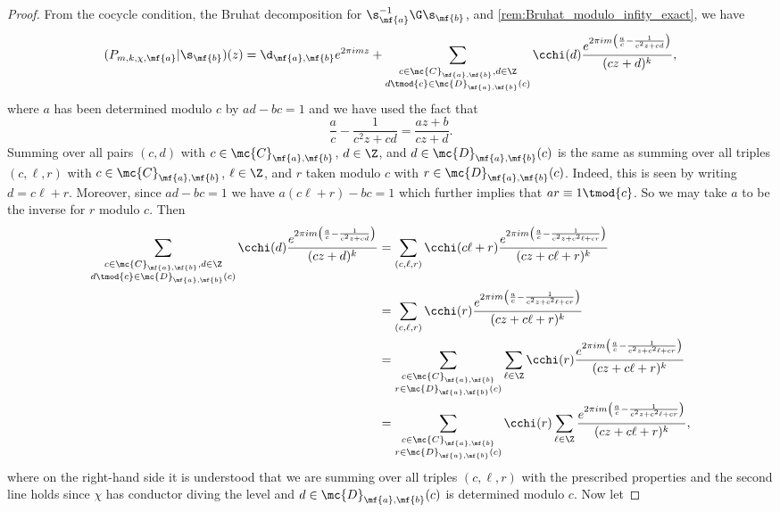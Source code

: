     \begin{proof}
      From the cocycle condition, the Bruhat decomposition for $\s_{\mf{a}}^{-1}\G\s_{\mf{b}}$, and \cref{rem:Bruhat_modulo_infity_exact}, we have
      \[
        (P_{m,k,\chi,\mf{a}}|\s_{\mf{b}})(z) = \d_{\mf{a},\mf{b}}e^{2\pi imz}+\sum_{\substack{c \in \mc{C}_{\mf{a},\mf{b}}, d \in \Z \\ d \tmod{c} \in \mc{D}_{\mf{a},\mf{b}}(c)}}\cchi(d)\frac{e^{2\pi im\left(\frac{a}{c}-\frac{1}{c^{2}z+cd}\right)}}{(cz+d)^{k}},
      \]
      where $a$ has been determined modulo $c$ by $ad-bc = 1$ and we have used the fact that
      \[
        \frac{a}{c}-\frac{1}{c^{2}z+cd} = \frac{az+b}{cz+d}.
      \]
      Summing over all pairs $(c,d)$ with $c \in \mc{C}_{\mf{a},\mf{b}}$, $d \in \Z$, and $d \in \mc{D}_{\mf{a},\mf{b}}(c)$ is the same as summing over all triples $(c,\ell,r)$ with $c \in \mc{C}_{\mf{a},\mf{b}}$, $\ell \in \Z$, and $r$ taken modulo $c$ with $r \in \mc{D}_{\mf{a},\mf{b}}(c)$. Indeed, this is seen by writing $d = c\ell+r$. Moreover, since $ad-bc = 1$ we have $a(c\ell+r)-bc = 1$ which further implies that $ar \equiv 1 \tmod{c}$. So we may take $a$ to be the inverse for $r$ modulo $c$. Then
      \begin{align*}
        \sum_{\substack{c \in \mc{C}_{\mf{a},\mf{b}}, d \in \Z \\ d \tmod{c} \in \mc{D}_{\mf{a},\mf{b}}(c)}}\cchi(d)\frac{e^{2\pi im\left(\frac{a}{c}-\frac{1}{c^{2}z+cd}\right)}}{(cz+d)^{k}} &= \sum_{(c,\ell,r)}\cchi(c\ell+r)\frac{e^{2\pi im\left(\frac{a}{c}-\frac{1}{c^{2}z+c^{2}\ell+cr}\right)}}{(cz+c\ell+r)^{k}} \\
        &= \sum_{(c,\ell,r)}\cchi(r)\frac{e^{2\pi im\left(\frac{a}{c}-\frac{1}{c^{2}z+c^{2}\ell+cr}\right)}}{(cz+c\ell+r)^{k}} \\
        &= \sum_{\substack{c \in \mc{C}_{\mf{a},\mf{b}} \\ r \in \mc{D}_{\mf{a},\mf{b}}(c)}}\sum_{\ell \in \Z}\cchi(r)\frac{e^{2\pi im\left(\frac{a}{c}-\frac{1}{c^{2}z+c^{2}\ell+cr}\right)}}{(cz+c\ell+r)^{k}} \\
        &= \sum_{\substack{c \in \mc{C}_{\mf{a},\mf{b}} \\ r \in \mc{D}_{\mf{a},\mf{b}}(c)}}\cchi(r)\sum_{\ell \in \Z}\frac{e^{2\pi im\left(\frac{a}{c}-\frac{1}{c^{2}z+c^{2}\ell+cr}\right)}}{(cz+c\ell+r)^{k}},
      \end{align*}
      where on the right-hand side it is understood that we are summing over all triples $(c,\ell,r)$ with the prescribed properties and the second line holds since $\chi$ has conductor diving the level and $d \in \mc{D}_{\mf{a},\mf{b}}(c)$ is determined modulo $c$. Now let

\end{proof}
